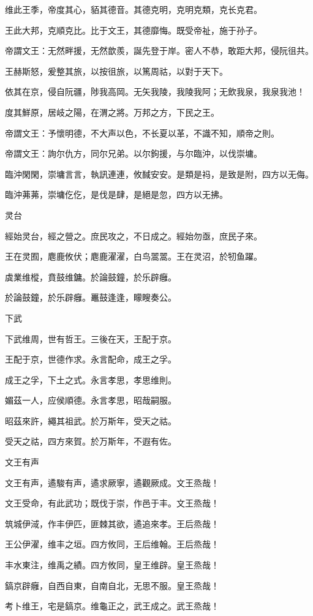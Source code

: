 维此王季，帝度其心，貊其德音。其德克明，克明克類，克长克君。

王此大邦，克順克比。比于文王，其德靡悔。既受帝祉，施于孙子。

帝謂文王：无然畔援，无然歆羨，誕先登于岸。密人不恭，敢距大邦，侵阮徂共。

王赫斯怒，爰整其旅，以按徂旅，以篤周祜，以對于天下。

依其在京，侵自阮疆，陟我高岡。无矢我陵，我陵我阿；无飲我泉，我泉我池！

度其鮮原，居岐之陽，在渭之將。万邦之方，下民之王。

帝謂文王：予懷明德，不大声以色，不长夏以革，不識不知，順帝之則。

帝謂文王：詢尔仇方，同尔兄弟。以尔鉤援，与尔臨沖，以伐崇墉。

臨沖閑閑，崇墉言言，執訊連連，攸馘安安。是類是祃，是致是附，四方以无侮。

臨沖茀茀，崇墉仡仡，是伐是肆，是絕是忽，四方以无拂。

灵台

經始灵台，經之營之。庶民攻之，不日成之。經始勿亟，庶民子來。

王在灵囿，麀鹿攸伏；麀鹿濯濯，白鸟翯翯。王在灵沼，於牣鱼躍。

虡業维樅，賁鼓维鏞。於論鼓鐘，於乐辟癰。

於論鼓鐘，於乐辟癰。鼉鼓逢逢，矇瞍奏公。

下武

下武维周，世有哲王。三後在天，王配于京。

王配于京，世德作求。永言配命，成王之孚。

成王之孚，下土之式。永言孝思，孝思维則。

媚茲一人，应侯順德。永言孝思，昭哉嗣服。

昭茲來許，繩其祖武。於万斯年，受天之祜。

受天之祜，四方來賀。於万斯年，不遐有佐。

文王有声

文王有声，遹駿有声，遹求厥寧，遹觀厥成。文王烝哉！

文王受命，有此武功；既伐于崇，作邑于丰。文王烝哉！

筑城伊淢，作丰伊匹，匪棘其欲，遹追來孝。王后烝哉！

王公伊濯，维丰之垣。四方攸同，王后维翰。王后烝哉！

丰水東注，维禹之績。四方攸同，皇王维辟。皇王烝哉！

鎬京辟癰，自西自東，自南自北，无思不服。皇王烝哉！

考卜维王，宅是鎬京。维龜正之，武王成之。武王烝哉！


